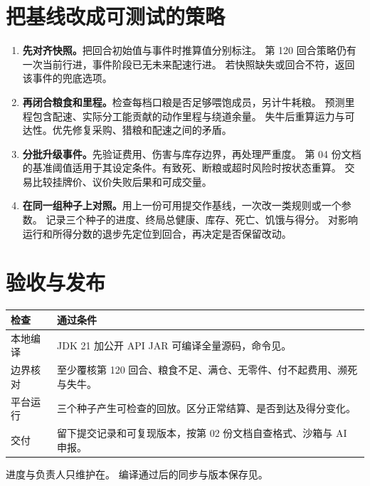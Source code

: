 \documentclass[UTF8,11pt,a4paper]{ctexart}
\begin{document}
\section{把基线改成可测试的策略}

\begin{enumerate}
  \item \textbf{先对齐快照。}把回合初始值与事件时推算值分别标注。
  第 120 回合策略仍有一次当前行进，事件阶段已无未来配速行进。
  若快照缺失或回合不符，返回该事件的兜底选项。
  \item \textbf{再闭合粮食和里程。}检查每档口粮是否足够喂饱成员，另计牛耗粮。
  预测里程包含配速、实际分工能贡献的动作里程与绕道余量。
  失牛后重算运力与可达性。优先修复采购、猎粮和配速之间的矛盾。
  \item \textbf{分批升级事件。}先验证费用、伤害与库存边界，再处理严重度。
  第 04 份文档的基准阈值适用于其设定条件。有致死、断粮或超时风险时按状态重算。
  交易比较挂牌价、议价失败后果和可成交量。
  \item \textbf{在同一组种子上对照。}用上一份可用提交作基线，一次改一类规则或一个参数。
  记录三个种子的进度、终局总健康、库存、死亡、饥饿与得分。
  对影响运行和所得分数的退步先定位到回合，再决定是否保留改动。
\end{enumerate}

\section{验收与发布}

\begin{center}\small
\begin{tabularx}{\linewidth}{@{}L{3.45cm}Y@{}}
\toprule
检查 & 通过条件 \\
\midrule
本地编译 & JDK 21 加公开 API JAR 可编译全量源码，命令见。 \\
边界核对 & 至少覆核第 120 回合、粮食不足、满仓、无零件、付不起费用、濒死与失牛。 \\
平台运行 & 三个种子产生可检查的回放。区分正常结算、是否到达及得分变化。 \\
交付 & 留下提交记录和可复现版本，按第 02 份文档自查格式、沙箱与 AI 申报。 \\
\bottomrule
\end{tabularx}
\end{center}

进度与负责人只维护在。
编译通过后的同步与版本保存见。
\end{document}
